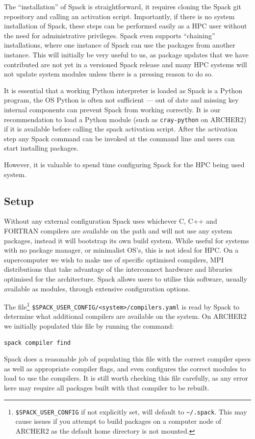 \documentclass[a4paper,11pt]{article}
\begin{document}
The ``installation'' of Spack is straightforward, it requires cloning the Spack git repository and calling an activation script.
Importantly, if there is no system installation of Spack, these steps can be performed easily as a HPC user without the need for administrative privileges.
Spack even supports ``chaining'' installations, where one instance of Spack can use the packages from another instance.
This will initially be very useful to us, as package updates that we have contributed are not yet in a versioned Spack release and many HPC systems will not update system modules unless there is a pressing reason to do so.

It is essential that a working Python interpreter is loaded as Spack is a Python program, the OS Python is often not sufficient --- out of date and missing key internal components can prevent Spack from working correctly.
It is our recommendation to load a Python module (such as \verb`cray-python` on ARCHER2) if it is available before calling the spack activation script.
After the activation step any Spack command can be invoked at the command line and users can start installing packages.

However, it is valuable to spend time configuring Spack for the HPC being used system.

\subsection{Setup}
\label{ssec:setup}
Without any external configuration Spack uses whichever C, C++ and FORTRAN compilers are available on the path and will not use any system packages, instead it will bootstrap its own build system.
While useful for systems with no package manager, or minimalist OS's, this is not ideal for HPC.
On a supercomputer we wish to make use of specific optimised compilers, MPI distributions that take advantage of the interconnect hardware and libraries optimised for the architecture.
Spack allows users to utilise this software, usually available as modules, through extensive configuration options.

The file\footnote{\texttt{\$SPACK\_USER\_CONFIG} if not explicitly set, will default to \texttt{\~{}/.spack}. This may cause issues if you attempt to build packages on a computer node of ARCHER2 as the default home directory is not mounted.}
\verb`$SPACK_USER_CONFIG/<system>/compilers.yaml` is read by Spack to determine what additional compilers are available on the system.
On ARCHER2 we initially populated this file by running the command:
\begin{lstlisting}[numbers=none]
spack compiler find	
\end{lstlisting}
Spack does a reasonable job of populating this file with the correct compiler specs as well as appropriate compiler flags, and even configures the correct modules to load to use the compilers.
It is still worth checking this file carefully, as any error here may require all packages built with that compiler to be rebuilt.
\end{document}
